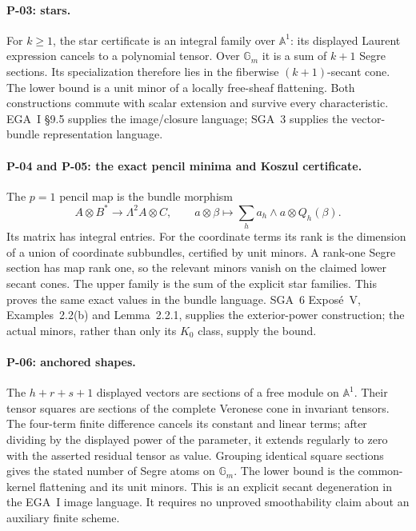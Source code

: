\paragraph{P-03: stars.}
For $k\geq1$, the star certificate is an integral family
over $\mathbb A^1$: its displayed Laurent expression
cancels to a polynomial tensor. Over $\mathbb G_m$ it
is a sum of $k+1$ Segre sections. Its specialization
therefore lies in the fiberwise $(k+1)$-secant cone.
The lower bound is a unit minor of a locally free-sheaf
flattening. Both constructions commute with scalar
extension and survive every characteristic.
EGA~I \S9.5 supplies the image/closure language;
SGA~3 supplies the vector-bundle representation language.

\paragraph{P-04 and P-05: the exact pencil minima and Koszul certificate.}
The $p=1$ pencil map is the bundle morphism
\[
 A\otimes B^*\longrightarrow\Lambda^2 A\otimes C,
 \qquad a\otimes\beta\longmapsto
       \sum_h a_h\wedge a\otimes Q_h(\beta).
\]
Its matrix has integral entries. For the coordinate
terms its rank is the dimension of a union of coordinate
subbundles, certified by unit minors. A rank-one Segre
section has map rank one, so the relevant minors vanish
on the claimed lower secant cones. The upper family is
the sum of the explicit star families. This proves the
same exact values in the bundle language. SGA~6
Expos\'e~V, Examples~2.2(b) and Lemma~2.2.1, supplies
the exterior-power construction; the actual minors,
rather than only its $K_0$ class, supply the bound.

\paragraph{P-06: anchored shapes.}
The $h+r+s+1$ displayed vectors are sections of a free
module on $\mathbb A^1$. Their tensor squares are
sections of the complete Veronese cone in invariant
tensors. The four-term finite difference cancels its
constant and linear terms; after dividing by the
displayed power of the parameter, it extends regularly
to zero with the asserted residual tensor as value.
Grouping identical square sections gives the stated
number of Segre atoms on $\mathbb G_m$. The lower bound
is the common-kernel flattening and its unit minors.
This is an explicit secant degeneration in the EGA~I
image language. It requires no unproved smoothability
claim about an auxiliary finite scheme.

